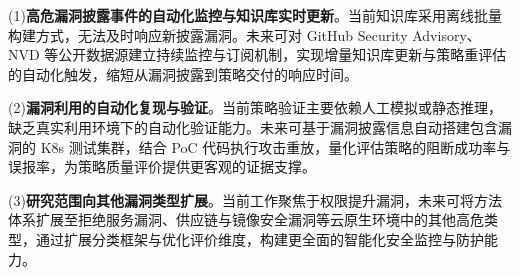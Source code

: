 (1)\textbf{高危漏洞披露事件的自动化监控与知识库实时更新}。当前知识库采用离线批量构建方式，无法及时响应新披露漏洞。未来可对 GitHub Security Advisory、NVD 等公开数据源建立持续监控与订阅机制，实现增量知识库更新与策略重评估的自动化触发，缩短从漏洞披露到策略交付的响应时间。

(2)\textbf{漏洞利用的自动化复现与验证}。当前策略验证主要依赖人工模拟或静态推理，缺乏真实利用环境下的自动化验证能力。未来可基于漏洞披露信息自动搭建包含漏洞的 K8s 测试集群，结合 PoC 代码执行攻击重放，量化评估策略的阻断成功率与误报率，为策略质量评价提供更客观的证据支撑。

(3)\textbf{研究范围向其他漏洞类型扩展}。当前工作聚焦于权限提升漏洞，未来可将方法体系扩展至拒绝服务漏洞、供应链与镜像安全漏洞等云原生环境中的其他高危类型，通过扩展分类框架与优化评价维度，构建更全面的智能化安全监控与防护能力。


